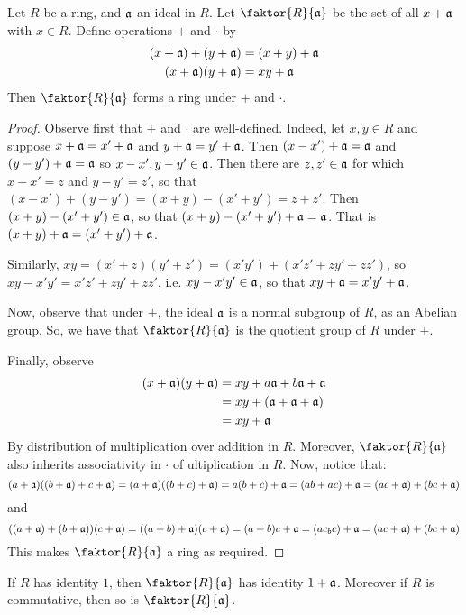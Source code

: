 \begin{theorem}\label{theorem_5.3.3}
  Let $R$ be a ring, and $\mathfrak{a}$ an ideal in $R$. Let  $\faktor{R}{\af}$ be the set
  of all $x+\mathfrak{a}$ with  $x \in R$. Define operations $+$ and $\cdot$ by
  \begin{align*}
    (x+\mathfrak{a})+(y+\mathfrak{a}) &=  (x+y)+\mathfrak{a} \\
    (x+\mathfrak{a})(y+\mathfrak{a})  &=  xy+\mathfrak{a}    \\
  \end{align*}
  Then $\faktor{R}{\af}$ forms a ring under $+$ and $\cdot$.
\end{theorem}
\begin{proof}
  Observe first that $+$ and $\cdot$ are well-defined. Indeed, let
  $x,y \in R$ and suppose $x+\mathfrak{a}=x'+\mathfrak{a}$ and $y+\mathfrak{a}=y'+\mathfrak{a}$. Then
  $(x-x')+\mathfrak{a}=\mathfrak{a}$ and $(y-y')+\mathfrak{a}=\mathfrak{a}$ so $x-x',y-y' \in \mathfrak{a}$. Then
  there are $z,z' \in \mathfrak{a}$ for which $x-x'=z$ and $y-y'=z'$, so that
  $(x-x')+(y-y')=(x+y)-(x'+y')=z+z'$. Then $(x+y)-(x'+y') \in \mathfrak{a}$, so
  that $(x+y)-(x'+y')+\mathfrak{a}=\mathfrak{a}$. That is $(x+y)+\mathfrak{a}=(x'+y')+\mathfrak{a}$.

  Similarly, $xy=(x'+z)(y'+z')=(x'y')+(x'z'+zy'+zz')$, so
  $xy-x'y'=x'z'+zy'+zz'$, i.e. $xy-x'y' \in \mathfrak{a}$, so that
  $xy+\mathfrak{a}=x'y'+\mathfrak{a}$.

  Now, observe that under $+$, the ideal $\mathfrak{a}$ is a normal subgroup of
  $R$, as an Abelian group. So, we have that $\faktor{R}{\af}$ is the
  quotient group of $R$ under $+$.

  Finally, observe
  \begin{align*}
    (x+\mathfrak{a})(y+\mathfrak{a})  &=  xy+a\mathfrak{a}+b\mathfrak{a}+\mathfrak{a} \\
                    &=  xy+(\mathfrak{a}+\mathfrak{a}+\mathfrak{a})  \\
                    &=  xy+\mathfrak{a}  \\
  \end{align*}
  By distribution of multiplication over addition in $R$. Moreover,
  $\faktor{R}{\af}$ also inherits associativity in $\cdot$ of ultiplication in
  $R$. Now, notice that:
  \begin{equation*}
    (a+\mathfrak{a})((b+\mathfrak{a})+c+\mathfrak{a})=(a+\mathfrak{a})((b+c)+\mathfrak{a})=a(b+c)+\mathfrak{a}=(ab+ac)+\mathfrak{a}=(ac+\mathfrak{a})+(bc+\mathfrak{a})
  \end{equation*}
  and
  \begin{equation*}
    ((a+\mathfrak{a})+(b+\mathfrak{a}))(c+\mathfrak{a})=((a+b)+\mathfrak{a})(c+\mathfrak{a})=(a+b)c+\mathfrak{a}=(ac_bc)+\mathfrak{a}=(ac+\mathfrak{a})+(bc+\mathfrak{a})
  \end{equation*}
  This makes $\faktor{R}{\af}$ a ring as required.
\end{proof}
\begin{corollary}
  If $R$ has identity $1$, then $\faktor{R}{\af}$ has identity
  $1+\mathfrak{a}$. Moreover if  $R$ is commutative, then so is $\faktor{R}{\af}$.
\end{corollary}

